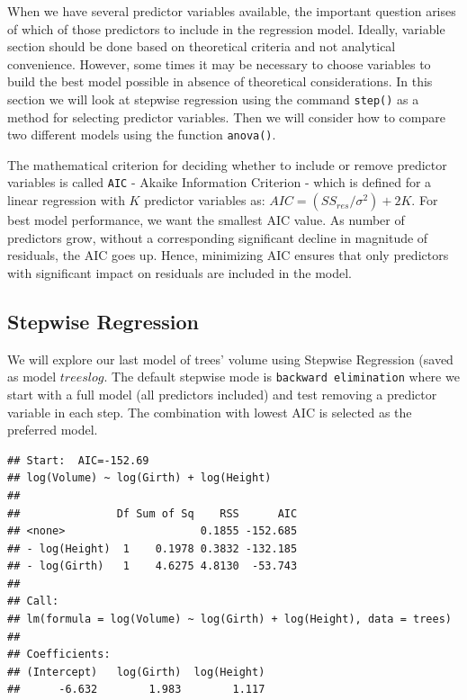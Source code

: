 \documentclass[10pt, letterpaper, twoside]{memoir}\usepackage{knitr}
\begin{document}
When we have several predictor variables available, the important question arises of which of those predictors to include in the regression model. Ideally, variable section should be done based on theoretical criteria and not analytical convenience. However, some times it may be necessary to choose variables to build the best model possible in absence of theoretical considerations. In this section we will look at stepwise regression using the command \texttt{step()} as a method for selecting predictor variables. Then we will consider how to compare two different models using the function \texttt{anova()}. 

The mathematical criterion for deciding whether to include or remove predictor variables is called \texttt{AIC} - Akaike Information Criterion - which is defined for a linear regression with $K$ predictor variables as: \( AIC = (SS_{res} / \sigma^2) + 2K \). For best model performance, we want the smallest AIC value. As number of predictors grow, without a corresponding significant decline in magnitude of residuals, the AIC goes up. Hence, minimizing AIC ensures that only predictors with significant impact on residuals are included in the model.

\subsection{Stepwise Regression}

We will explore our last model of trees' volume using Stepwise Regression (saved as model $treeslog$. The default stepwise mode is \texttt{backward elimination} where we start with a full model (all predictors included) and test removing a predictor variable in each step. The combination with lowest AIC is selected as the preferred model.  
\begin{knitrout}
\color{fgcolor}\begin{kframe}
\begin{alltt}
\hlstd{(}   \hlstd{=} \hlstd{)}
\end{alltt}
\begin{verbatim}
## Start:  AIC=-152.69
## log(Volume) ~ log(Girth) + log(Height)
## 
##               Df Sum of Sq    RSS      AIC
## <none>                     0.1855 -152.685
## - log(Height)  1    0.1978 0.3832 -132.185
## - log(Girth)   1    4.6275 4.8130  -53.743
## 
## Call:
## lm(formula = log(Volume) ~ log(Girth) + log(Height), data = trees)
## 
## Coefficients:
## (Intercept)   log(Girth)  log(Height)  
##      -6.632        1.983        1.117
\end{verbatim}
\end{kframe}
\end{knitrout}
\end{document}
